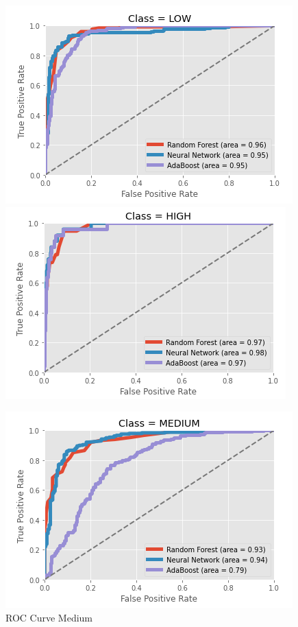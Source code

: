 \begin{figure}[t]
\begin{center}
\begin{minipage}{.5\textwidth}
  \centering
  \includegraphics[width=0.9\linewidth]{imgs/roc_low.png}
\end{minipage}%
\begin{minipage}{.5\textwidth}
  \centering
  \includegraphics[width=0.9\linewidth]{imgs/roc_high.png}
\end{minipage}
\end{center}
\end{figure}

\begin{figure}[t]
    \includegraphics[scale=0.45]{imgs/roc_medium.png}
    \centering
    \caption{ROC Curve Medium}
    \hrulefill\vspace{15pt}\par
\end{figure}


